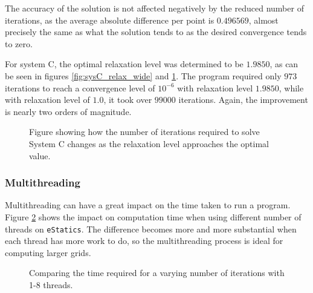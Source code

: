 The accuracy of the solution is not affected negatively by the reduced number of iterations, as the average absolute difference per point is $0.496569$, almost precisely the same as what the solution tends to as the desired convergence tends to zero.

For system C, the optimal relaxation level was determined to be $1.9850$, as can be seen in figures \ref{fig:sysC_relax_wide} and \ref{fig:sysC_relax_narrow}. The program required only $973$ iterations to reach a convergence level of $10^{-6}$ with relaxation level $1.9850$, while with relaxation level of $1.0$, it took over $99000$ iterations. Again, the improvement is nearly two orders of magnitude.

\begin{figure}[h!]
\centering
\setlength\fboxsep{0pt}
\setlength\fboxrule{0.5pt}
\label{fig:sysC_relax_narrow}
\caption{Figure showing how the number of iterations required to solve System C changes as the relaxation level approaches the optimal value.}
\end{figure}

\subsubsection{Multithreading}
Multithreading can have a great impact on the time taken to run a program. Figure \ref{fig:multiple_multithreads} shows the impact on computation time when using different number of threads on \lstinline|eStatics|. The difference becomes more and more substantial when each thread has more work to do, so the multithreading process is ideal for computing larger grids.

\begin{figure}[h!]
\centering
\setlength\fboxsep{0pt}
\setlength\fboxrule{0.5pt}
\label{fig:multiple_multithreads}
\caption{Comparing the time required for a varying number of iterations with 1-8 threads.}
\end{figure}
